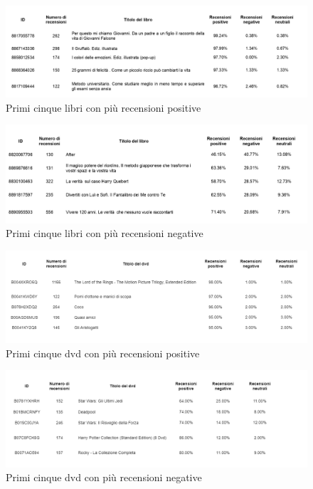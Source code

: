 		\begin{figure} [h]
			\includegraphics[width=\textwidth]{Figure/top_pos_book_table}
			\caption{Primi cinque libri con più recensioni positive}
			\label{fig:top_pos_book_table}
		\end{figure}
			
		\begin{figure} [h]
			\includegraphics[width=\textwidth]{Figure/top_neg_book_table}
			\caption{Primi cinque libri con più recensioni negative}
			\label{fig:top_neg_book_table}
		\end{figure}
		
		\begin{figure} [h]
			\includegraphics[width=\textwidth]{Figure/top_pos_film_table}
			\caption{Primi cinque dvd con più recensioni positive}
			\label{fig:top_pos_film_table}
		\end{figure}
		
		\begin{figure} [h]
			\includegraphics[width=\textwidth]{Figure/top_neg_film_table}
			\caption{Primi cinque dvd con più recensioni negative}
			\label{fig:top_neg_film_table}
		\end{figure}
		
